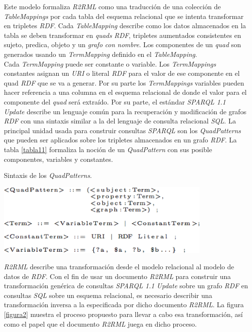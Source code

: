 Este modelo formaliza \textit{R2RML} como una traducci\'on de una colecci\'on de \textit{TableMappings} por cada tabla del esquema relacional que se intenta transformar en tripletes \textit{RDF}. Cada \textit{TableMapping} describe como los datos almacenados en la tabla se deben transformar en \textit{quads} \textit{RDF}, tripletes aumentados consistentes en sujeto, predica, objeto y un \textit{grafo con nombre}. Los componentes de un \textit{quad} son generados usando un \textit{TermMapping} definido en el \textit{TableMapping}.\\
Cada \textit{TermMapping} puede ser constante o variable. Los \textit{TermMappings} constantes asignan un \textit{URI} o literal \textit{RDF} para el valor de ese componente en el quad \textit{RDF} que se va a generar. Por su parte los \textit{TermMappings} variables pueden hacer referencia a una columna en el esquema relacional de donde el valor para el componente del \textit{quad} ser\'a extra\'ido.
Por su parte, el est\'andar \textit{SPARQL 1.1 Update} describe un lenguaje com\'un para la recuperaci\'on y modificaci\'on de grafos \textit{RDF} con una sintaxis similar a la del lenguaje de consulta relacional \textit{SQL}. La principal unidad usada para construir consultas \textit{SPARQL} son los \textit{QuadPatterns} que pueden ser aplicados sobre los tripletes almacenados en un grafo \textit{RDF}. La tabla \ref{tabla11} formaliza la noci\'on de un \textit{QuadPattern} con sus posible componentes, variables y constantes.\\

\begin{table}
\vspace{2.4in}
\caption{Sintaxis de los \textit{QuadPatterns}.}
\vspace{5mm}
\includegraphics[width=0.8\textwidth]{tabla11}
\label{tabla11}
\end{table}


\textit{R2RML} describe una transformaci\'on desde el modelo relacional al modelo de datos de \textit{RDF}. Con el fin de usar un documento \textit{R2RML} para construir una transformaci\'on gen\'erica de consultas \textit{SPARQL 1.1 Update} sobre un grafo \textit{RDF} en consultas \textit{SQL} sobre un esquema relacional, es necesario describir una transformaci\'on inversa a la especificada por dicho documento \textit{R2RML}. La figura \ref{figura2} muestra el proceso propuesto para llevar a cabo esa transformaci\'on, as\'i como el papel que el documento \textit{R2RML} juega en dicho proceso.\\

